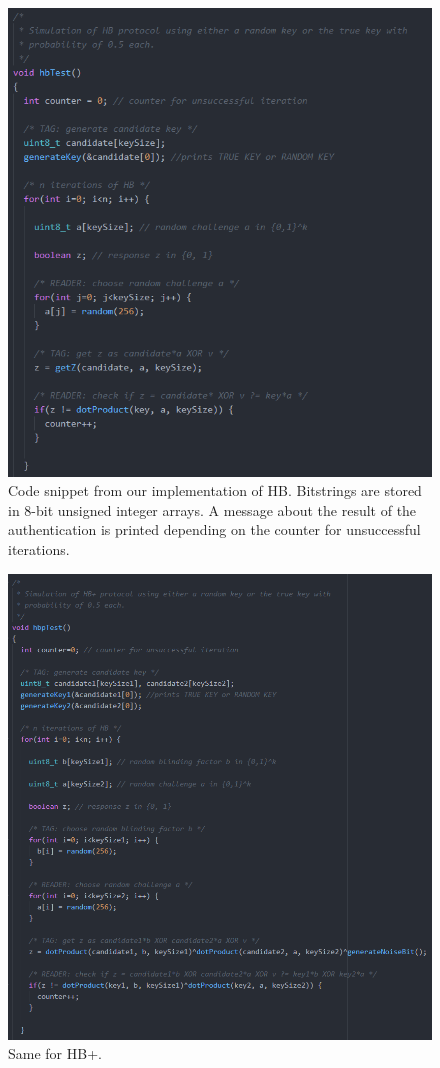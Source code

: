 \documentclass[11pt,a4paper]{article}
\begin{document}
\begin{figure}[h]
	\includegraphics[width=12cm]{hb_code}
	\centering
	\caption{Code snippet from our implementation of HB. Bitstrings are stored in 8-bit unsigned integer arrays. A message about the result of the authentication is printed depending on the counter for unsuccessful iterations.}
	\label{hb_code}
\end{figure}

\begin{figure}[h]
	\includegraphics[width=12cm]{hbp_code}
	\centering
	\caption{Same for HB+.}
	\label{hbp_code}
\end{figure}
\end{document}
